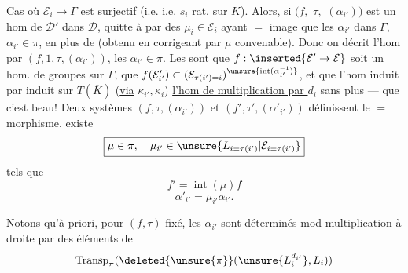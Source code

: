 \uline{Cas où}  $\mathcal E_i\to\Gamma$ est \uline{surjectif} (i.e.   i.e. $s_i$ rat. sur $K$).
Alors, si $(f,$ \deleted{\unsure{$\alpha$,}} $\tau,$  $(\alpha_{i'}))$ est un hom de $\mathcal D'$ dans $\mathcal D$,  quitte à   par des $\mu_i\in\mathcal E_i$ ayant $=$ image que les $\alpha_{i'}$ dans $\Gamma$,  $\alpha_{i'}\in\pi$, en plus de  (obtenu en corrigeant par $\mu$ convenable).
Donc on décrit l'hom  par $(f,1,\tau,(\alpha_{i'}))$, les $\alpha_{i'}\in\pi$. Les    sont que $f:\inserted{\mathcal E'\to\mathcal E}$ soit un hom. de groupes sur $\Gamma$, que  $f(\mathcal E'_{i'})\subset(\mathcal E_{\tau(i')=i})^{\unsure{\operatorname{int}(\alpha_{i'}^{-1})}}$, et que l'hom induit  par    induit sur $T(\overline K)$ (\uline{via} $\kappa_{i'},\kappa_i$) \uline{l'hom de multiplication par $d_i$} sans plus --- que c'est beau!
Deux systèmes $(f,\tau,(\alpha_{i'}))$ et $(f',\tau',(\alpha'_{i'}))$ définissent le $=$ morphisme,   existe
\[
 \boxed{\mu\in\pi,\quad\mu_{i'}\in\unsure{L_{i=\tau(i')}|\mathcal E_{i=\tau(i')}}}
\]
tels que
\[
 f'=\operatorname{int}(\mu)f
\]
\[
 \alpha'_{i'}=\mu_{i'}\alpha_{i'}.
\]

 Notons qu'à priori, pour $(f,\tau)$ fixé, les $\alpha_{i'}$ sont déterminés mod multiplication à droite par des éléments de
\[
 \operatorname{Transp}_{\pi}(\deleted{\unsure{\pi}}(\unsure{L_i^{d_{i'}}},L_i))
\]

